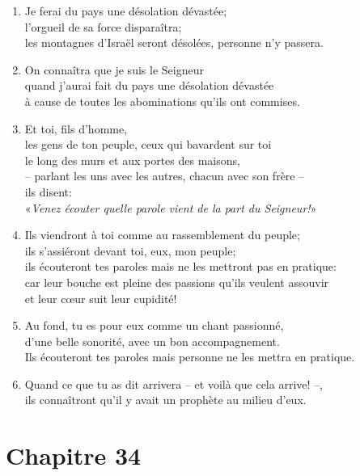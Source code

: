 \begin{enumerate}[leftmargin=\psleftmargin, labelsep = \pslabelsep, label={\arabic*}, font=\color{\pscolor}\small\textsuperscript, parsep=0em, itemsep=0em, topsep=0em ]
    \item Je ferai du pays une désolation dévastée; \\ l’orgueil de sa force disparaîtra; \\ les montagnes d’Israël seront désolées, personne n’y passera.
    \item On connaîtra que je suis le Seigneur \\ quand j’aurai fait du pays une désolation dévastée \\ à cause de toutes les abominations qu’ils ont commises. \parSpace
    \item Et toi, fils d’homme, \\ les gens de ton peuple, ceux qui bavardent sur toi \\ le long des murs et aux portes des maisons, \\– parlant les uns avec les autres, chacun avec son frère – \\ ils disent: \\ \decalage «\textit{Venez écouter quelle parole vient de la part du Seigneur!}» 
    \item Ils viendront à toi comme au rassemblement du peuple; \\ ils s’assiéront devant toi, eux, mon peuple; \\ ils écouteront tes paroles mais ne les mettront pas en pratique: \\ car leur bouche est pleine des passions qu’ils veulent assouvir \\ et leur cœur suit leur cupidité!
    \item Au fond, tu es pour eux comme un chant passionné, \\ d’une belle sonorité, avec un bon accompagnement. \\ Ils écouteront tes paroles mais personne ne les mettra en pratique. \verseSpace
    \item Quand ce que tu as dit arrivera – et voilà que cela arrive! –,\\ ils connaîtront qu’il y avait un prophète au milieu d’eux.
\end{enumerate}
\newpage

\section*{Chapitre 34}
